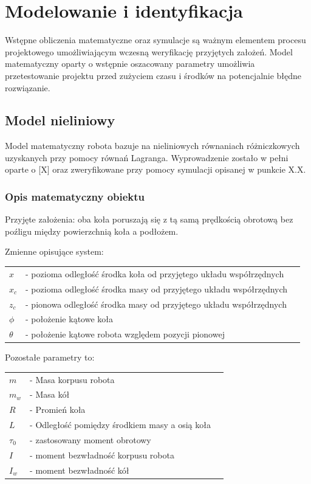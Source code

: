 \newcommand{\Lagr}{\mathcal{L}}
\chapter{Modelowanie i identyfikacja}
\label{cha:model}

Wstępne obliczenia matematyczne oraz symulacje są ważnym elementem procesu projektowego umożliwiającym wczesną weryfikację przyjętych założeń. Model matematyczny oparty o wstępnie oszacowany parametry umożliwia przetestowanie projektu przed zużyciem czasu i środków na potencjalnie błędne rozwiązanie. 

\section{Model nieliniowy}
\label{nieliniowy}

Model matematyczny robota bazuje na nieliniowych równaniach różniczkowych uzyskanych przy pomocy równań Lagranga. Wyprowadzenie zostało w pełni oparte o [X] oraz zweryfikowane przy pomocy symulacji opisanej w punkcie X.X. 

\subsection{Opis matematyczny obiektu}

Przyjęte założenia: oba koła poruszają się z tą samą prędkością obrotową bez poźligu między powierzchnią koła a podłożem.

Zmienne opisujące system:


	\begin{tabular}{  l l  p{3cm} |}
		$x$& - pozioma odległość środka koła od przyjętego układu współrzędnych\\ 
		$x_c$& - pozioma odległość środka masy od przyjętego układu współrzędnych\\ 
		$z_c$& - pionowa odległość środka masy od przyjętego układu współrzędnych\\ 
		$\phi$& - położenie kątowe koła\\ 
		$\theta$& - położenie kątowe robota względem pozycji pionowej\\ 			
	\end{tabular}  



Pozostałe parametry to:


	\begin{tabular}{  l l  p{3cm} |}
		$m$& - Masa korpusu robota\\ 
		$m_w$& - Masa kół\\ 
		$R$& - Promień koła\\ 
		$L$& - Odległość pomiędzy środkiem masy a osią koła\\ 
		$\tau_0$& - zastosowany moment obrotowy\\ 
		$I$& - moment bezwładność korpusu robota\\ 
		$I_w$& - moment bezwładność kół 		\\ 	
	\end{tabular}  



